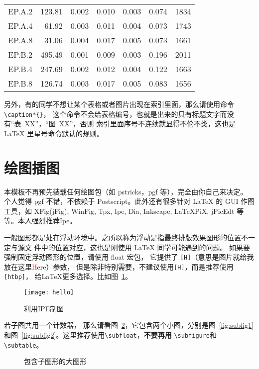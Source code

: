 \begin{longtable}[c]{c*{6}{r}}
  EP.A.2   & 123.81                       & 0.002                        & 0.010 & 0.003 & 0.074 & 1834   \\
  EP.A.4   & 61.92                        & 0.003                        & 0.011 & 0.004 & 0.073 & 1743   \\
  EP.A.8   & 31.06                        & 0.004                        & 0.017 & 0.005 & 0.073 & 1661   \\
  EP.B.2   & 495.49                       & 0.001                        & 0.009 & 0.003 & 0.196 & 2011   \\
  EP.B.4   & 247.69                       & 0.002                        & 0.012 & 0.004 & 0.122 & 1663   \\
  EP.B.8   & 126.74                       & 0.003                        & 0.017 & 0.005 & 0.083 & 1656   \\
  \bottomrule[1.5pt]
\end{longtable}

另外，有的同学不想让某个表格或者图片出现在索引里面，那么请使用命令 \verb|\caption*{}|，
这个命令不会给表格编号，也就是出来的只有标题文字而没有“表~XX”，“图~XX”，否则
索引里面序号{\kai 不连续}就显得不伦不类，这也是 \LaTeX{} 里星号命令默认的规则。

\section{绘图插图}

本模板不再预先装载任何绘图包（如 \textsf{pstricks，pgf} 等），完全由你自己来决定。
个人觉得 \textsf{pgf} 不错，不依赖于 Postscript。此外还有很多针对 \LaTeX{} 的
GUI 作图工具，如 XFig(jFig), WinFig, Tpx, Ipe, Dia, Inkscape, LaTeXPiX,
jPicEdt 等等。本人强烈推荐\textsf{Ipe}。

一般图形都是处在浮动环境中。之所以称为浮动是指最终排版效果图形的位置不一定与源文
件中的位置对应，这也是刚使用 \LaTeX{} 同学可能遇到的问题。
如果要强制固定浮动图形的位置，请使用 \textsf{float} 宏包，
它提供了 \texttt{[H]}（意思是图片就给我放在这里\textcolor{red}{H}ere）参数，
但是除非特别需要，不建议使用\texttt{[H]}，而是推荐使用\texttt{[htbp]}，
给\LaTeX{}更多选择。比如图~\ref{fig:ipe}。
\begin{figure}[htbp] %
  \centering
  \texttt{[image: hello]}
  \caption{利用IPE制图}
  \label{fig:ipe}
\end{figure}

若子图共用一个计数器，
那么请看图~\ref{fig:big1}，它包含两个小图，分别是图~\ref{fig:subfig1}
和图~\ref{fig:subfig2}。这里推荐使用\verb|\subfloat|，{\bf 不要再用}
\verb|\subfigure|和\verb|\subtable|。
\begin{figure}[htb]
  \centering%
  \subfloat[第一个小图形]{%
    \label{fig:subfig1}
    \texttt{[image: xh]}}\hspace{4em}%
  \caption{包含子图形的大图形}
  \label{fig:big1}
\end{figure}

